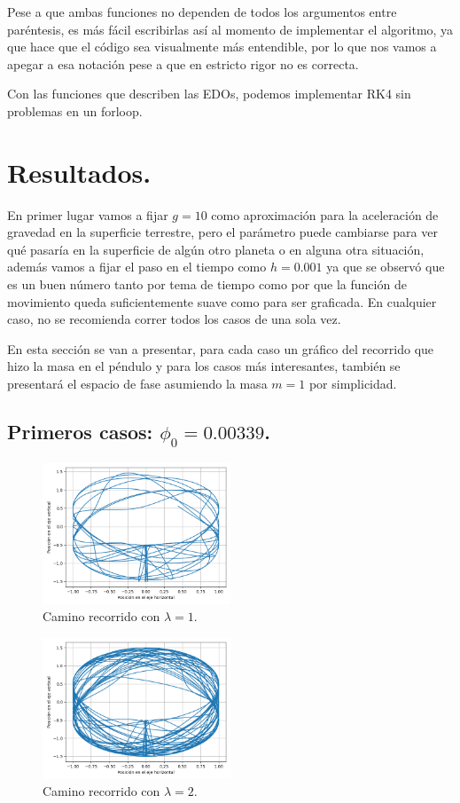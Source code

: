 \documentclass[letter, 11pt]{article}
\begin{document}
Pese a que ambas funciones no dependen de todos
los argumentos entre paréntesis, es más fácil
escribirlas así al momento de implementar el
algoritmo, ya que hace que el código sea
visualmente más entendible, por lo que nos
vamos a apegar a esa notación pese a que en
estricto rigor no es correcta.

Con las funciones que describen las EDOs,
podemos implementar RK4 sin problemas en un
forloop.

\section{Resultados.}

En primer lugar vamos a fijar $g=10$ como
aproximación para la aceleración de gravedad en
la superficie terrestre, pero el parámetro
puede cambiarse para ver qué pasaría en la
superficie de algún otro planeta o en alguna
otra situación, además vamos a fijar el paso en
el tiempo como $h=0.001$ ya que se observó que
es un buen número tanto por tema de tiempo como
por que la función de movimiento queda
suficientemente suave como para ser graficada.
En cualquier caso, no se recomienda correr
todos los casos de una sola vez.

En esta sección se van a presentar, para cada
caso un gráfico del recorrido que hizo la masa
en el péndulo y para los casos más
interesantes, también se presentará el espacio
de fase asumiendo la masa $m=1$ por simplicidad.


\subsection{Primeros casos: $\phi_0=0.00339$.}

\begin{figure}[h!]
 \centering
 \includegraphics[width=0.5\textwidth]{./imagenes/img1.png}
 \caption{Camino recorrido con $\lambda = 1$.}
\end{figure}

\begin{figure}[h!]
 \centering
 \includegraphics[width=0.5\textwidth]{./imagenes/img2.png}
 \caption{Camino recorrido con $\lambda = 2$.}
\end{figure}
\end{document}
